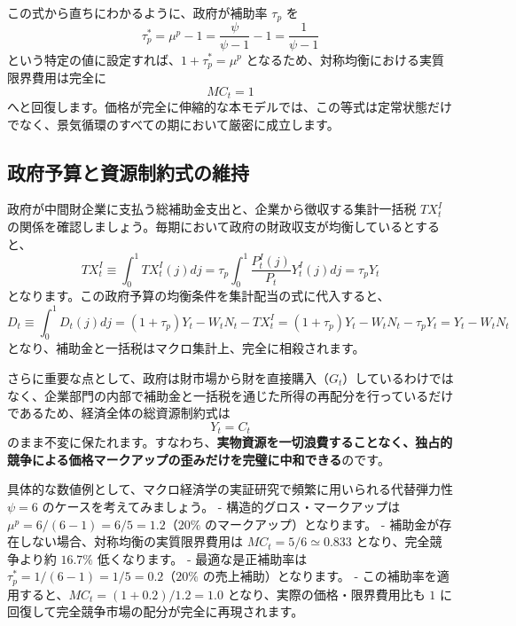 \documentclass[
  japanese,
  lualatex,
  ja=standard,
  12pt,
  a4paper]{ltjsarticle}
\begin{document}
この式から直ちにわかるように、政府が補助率 \(\tau_p\) を \[
\tau_p^* = \mu^p - 1 = \frac{\psi}{\psi-1} - 1 = \frac{1}{\psi-1}
\] という特定の値に設定すれば、\(1+\tau_p^* = \mu^p\)
となるため、対称均衡における実質限界費用は完全に \[
MC_t = 1
\]
へと回復します。価格が完全に伸縮的な本モデルでは、この等式は定常状態だけでなく、景気循環のすべての期において厳密に成立します。

\subsection{政府予算と資源制約式の維持}\label{ux653fux5e9cux4e88ux7b97ux3068ux8cc7ux6e90ux5236ux7d04ux5f0fux306eux7dadux6301}

政府が中間財企業に支払う総補助金支出と、企業から徴収する集計一括税
\(TX_t^I\)
の関係を確認しましょう。毎期において政府の財政収支が均衡しているとすると、
\[
TX_t^I \equiv \int_0^1 TX_t^I(j) dj = \tau_p \int_0^1 \frac{P_t^I(j)}{P_t} Y_t^I(j) dj = \tau_p Y_t
\] となります。この政府予算の均衡条件を集計配当の式に代入すると、 \[
D_t \equiv \int_0^1 D_t(j) dj = (1+\tau_p) Y_t - W_t N_t - TX_t^I = (1+\tau_p) Y_t - W_t N_t - \tau_p Y_t = Y_t - W_t N_t
\] となり、補助金と一括税はマクロ集計上、完全に相殺されます。

さらに重要な点として、政府は財市場から財を直接購入（\(G_t\)）しているわけではなく、企業部門の内部で補助金と一括税を通じた所得の再配分を行っているだけであるため、経済全体の総資源制約式は
\[
Y_t = C_t
\]
のまま不変に保たれます。すなわち、\textbf{実物資源を一切浪費することなく、独占的競争による価格マークアップの歪みだけを完璧に中和できる}のです。

\begin{tcolorbox}[enhanced jigsaw, arc=.35mm, bottomrule=.15mm, bottomtitle=1mm, breakable, colback=white, colbacktitle=quarto-callout-tip-color!10!white, colframe=quarto-callout-tip-color-frame, coltitle=black, left=2mm, leftrule=.75mm, opacityback=0, opacitybacktitle=0.6, rightrule=.15mm, title=\textcolor{quarto-callout-tip-color}{\faLightbulb}\hspace{0.5em}{数値例：\(\psi=6\)}, titlerule=0mm, toprule=.15mm, toptitle=1mm]

具体的な数値例として、マクロ経済学の実証研究で頻繁に用いられる代替弾力性
\(\psi = 6\) のケースを考えてみましょう。 - 構造的グロス・マークアップは
\(\mu^p = 6/(6-1) = 6/5 = 1.2\)（\(20\%\) のマークアップ）となります。 -
補助金が存在しない場合、対称均衡の実質限界費用は
\(MC_t = 5/6 \simeq 0.833\) となり、完全競争より約 \(16.7\%\)
低くなります。 - 最適な是正補助率は
\(\tau_p^* = 1/(6-1) = 1/5 = 0.2\)（\(20\%\) の売上補助）となります。 -
この補助率を適用すると、\(MC_t = (1+0.2)/1.2 = 1.0\)
となり、実際の価格・限界費用比も \(1\)
に回復して完全競争市場の配分が完全に再現されます。

\end{tcolorbox}
\end{document}

